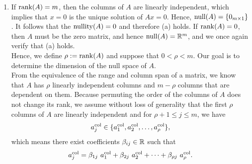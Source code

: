 \begin{enumerate}
\renewcommand{\labelenumi}{(\alph{enumi})}
\setlength{\itemsep}{.2cm}

\item  If $\mathrm{rank}(A)=m$, then the columns of $A$ are linearly independent, which implies that $x=0$ is the unique solution of $Ax=0$. Hence, $\mathrm{null}(A) = \{ 0_{m \times 1}\}$. It follows that the $\mathrm{nullity}(A)=0$ and therefore (a) holds. If $\mathrm{rank}(A)=0$, then $A$ must be the zero matrix, and hence  $\mathrm{null}(A) = \mathbb R^m$, and we once again verify that (a) holds.\\

Hence, we define $\rho:=\mathrm{rank}(A)$ and suppose that $0 < \rho < m$. Our goal is to determine the dimension of the null space of $A$.\\

From the equivalence of the range and column span of a matrix, we know that $A$ has $\rho$ linearly independent columns and $m-\rho$ columns that are dependent on them. Because permuting the order of the columns of $A$ does not change its rank, we assume without loss of generality that the first $\rho$ columns of $A$ are linearly independent and for $\rho+1 \le j \le m$, we have
$$ a^{\rm col}_j \in \{ a^{\rm col}_1, a^{\rm col}_2, \ldots, a^{\rm col}_\rho \}, $$
which means there exist coefficients $\beta_{ij} \in \mathbb R$ such that
\begin{equation}
    \label{eq:A2equalsA1B}
    a^{\rm col}_j= \beta_{1j}~ a^{\rm col}_1 + \beta_{2j}~ a^{\rm col}_2 +  \cdots + \beta_{\rho j} ~ a^{\rm col}_\rho.
\end{equation} 


\end{enumerate}
